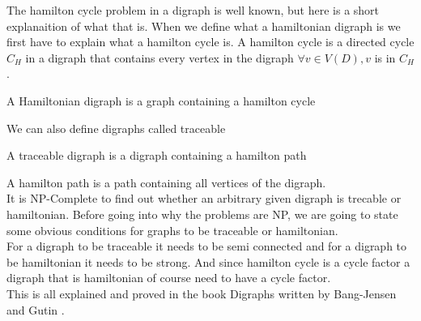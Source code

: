 The hamilton cycle problem in a digraph is well known, but here is a short explanaition of what that is.
When we define what a hamiltonian digraph is we first have to explain what a hamilton cycle is. 
A hamilton cycle is a directed cycle $C_H$ in a digraph that contains every vertex in the digraph $\forall v\in V(D), v$ is in $C_H$.\\
\begin{definition}
    A Hamiltonian digraph is a graph containing a hamilton cycle 
\end{definition} 
We can also define digraphs called traceable
\begin{definition}
    A traceable digraph is a digraph containing a hamilton path
\end{definition}
A hamilton path is a path containing all vertices of the digraph.\\
It is NP-Complete to find out whether an arbitrary given digraph is trecable or hamiltonian.
Before going into why the problems are NP, we are going to state some obvious conditions for graphs to be traceable or hamiltonian. \\
For a digraph to be traceable it needs to be semi connected and for a digraph to be hamiltonian it needs to be strong. And since hamilton cycle is a cycle factor a digraph that is hamiltonian of course need to have a cycle factor.\\
This is all explained and proved in the book Digraphs written by Bang-Jensen and Gutin \cite{banggutin}. 

